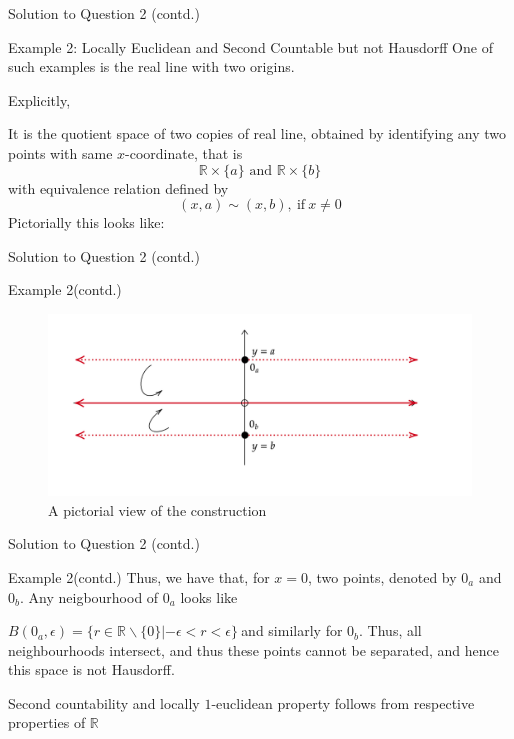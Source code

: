 \documentclass{beamer}
\begin{document}
\begin{frame}{Solution to Question 2 (contd.)}
\begin{alertblock}{Example 2: Locally Euclidean and Second Countable but not Hausdorff}
One of such examples is the real line with two origins. 

Explicitly,

It is the quotient space of two copies of real line, obtained by identifying any two points with same $\displaystyle x$-coordinate, that is 
\begin{equation*}
\mathbb{R} \times \{a\}\text{ and }\mathbb{R} \times \{b\}
\end{equation*}
with equivalence relation defined by 
\begin{equation*}
( x,a) \sim ( x,b) ,\ \text{if} \ x\neq 0
\end{equation*}
Pictorially this looks like:
\end{alertblock}  
\end{frame}


\begin{frame}{Solution to Question 2 (contd.)}
\begin{alertblock}{Example 2(contd.)}
\begin{figure}
    \centering
    \includegraphics[width = 1.1\textwidth]{diag-3.png}
    \caption{A pictorial view of the construction}
\end{figure}

\end{alertblock}  
\end{frame}

\begin{frame}{Solution to Question 2 (contd.)}
\begin{alertblock}{Example 2(contd.)}
Thus, we have that, for $\displaystyle x=0$, two points, denoted by $\displaystyle 0_{a}$ and $\displaystyle 0_{b}$. Any neigbourhood of $\displaystyle 0_{a}$ looks like  

$\displaystyle B( 0_{a} ,\epsilon ) =\{r\in \mathbb{R} \backslash \{0\} |-\epsilon < r< \epsilon \} \ $and similarly for $\displaystyle 0_{b}$. Thus, all neighbourhoods intersect, and thus these points cannot be separated, and hence this space is not Hausdorff. 

Second countability and locally $\displaystyle 1$-euclidean property follows from respective properties of $\displaystyle \mathbb{R}$ 
\end{alertblock}  
\end{frame}
\end{document}
